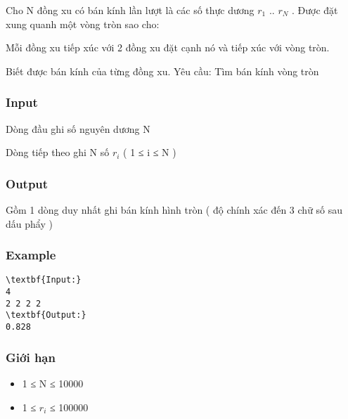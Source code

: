 



   Cho N đồng xu có bán kính lần lượt là các số thực dương $r_{1}$   .. $r_{N}$   . Được đặt xung quanh một vòng tròn sao cho:  

   Mỗi đồng xu tiếp xúc với 2 đồng xu đặt cạnh nó và tiếp xúc với vòng tròn.  

   Biết được bán kính của từng đồng xu. Yêu cầu: Tìm bán kính vòng tròn  

\subsubsection{   Input  }

   Dòng đầu ghi số nguyên dương N  

   Dòng tiếp theo ghi N số $r_{i}$   ( 1 ≤ i ≤ N )  

\subsubsection{   Output  }

   Gồm 1 dòng duy nhất ghi bán kính hình tròn ( độ chính xác đến 3 chữ số sau dấu phẩy )  

\subsubsection{   Example  }
\begin{verbatim}
\textbf{Input:}
4
2 2 2 2
\textbf{Output:}
0.828
\end{verbatim}

\subsubsection{   Giới hạn  }
\begin{itemize}
	\item     1 ≤ N ≤ 10000   
	\item     1 ≤ $r_{i}$    ≤ 100000   
\end{itemize}
